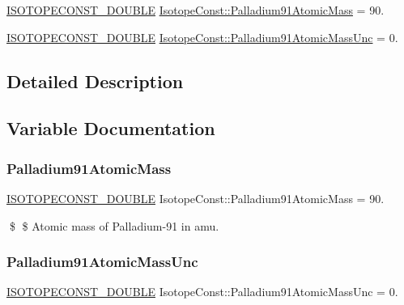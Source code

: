 \begin{DoxyCompactItemize}
\item 
\mbox{\hyperlink{group___isotope_const-_macros_ga8f45a7272ce02c0b4c65c44636ed719a}{I\+S\+O\+T\+O\+P\+E\+C\+O\+N\+S\+T\+\_\+\+D\+O\+U\+B\+LE}} \mbox{\hyperlink{group___isotope_const-_palladium-_pd91_ga8577a1974e32ec66ca52d7e2391aa9aa}{Isotope\+Const\+::\+Palladium91\+Atomic\+Mass}} = 90.
\item 
\mbox{\hyperlink{group___isotope_const-_macros_ga8f45a7272ce02c0b4c65c44636ed719a}{I\+S\+O\+T\+O\+P\+E\+C\+O\+N\+S\+T\+\_\+\+D\+O\+U\+B\+LE}} \mbox{\hyperlink{group___isotope_const-_palladium-_pd91_ga65ca10c35872947e0a65653036e93269}{Isotope\+Const\+::\+Palladium91\+Atomic\+Mass\+Unc}} = 0.
\end{DoxyCompactItemize}


\subsection{Detailed Description}


\subsection{Variable Documentation}
\mbox{\label{group___isotope_const-_palladium-_pd91_ga8577a1974e32ec66ca52d7e2391aa9aa}} 
\subsubsection{\texorpdfstring{Palladium91\+Atomic\+Mass}{Palladium91AtomicMass}}
{\footnotesize\ttfamily \mbox{\hyperlink{group___isotope_const-_macros_ga8f45a7272ce02c0b4c65c44636ed719a}{I\+S\+O\+T\+O\+P\+E\+C\+O\+N\+S\+T\+\_\+\+D\+O\+U\+B\+LE}} Isotope\+Const\+::\+Palladium91\+Atomic\+Mass = 90.}

\$ \$ Atomic mass of Palladium-\/91 in amu. \mbox{\label{group___isotope_const-_palladium-_pd91_ga65ca10c35872947e0a65653036e93269}} 
\subsubsection{\texorpdfstring{Palladium91\+Atomic\+Mass\+Unc}{Palladium91AtomicMassUnc}}
{\footnotesize\ttfamily \mbox{\hyperlink{group___isotope_const-_macros_ga8f45a7272ce02c0b4c65c44636ed719a}{I\+S\+O\+T\+O\+P\+E\+C\+O\+N\+S\+T\+\_\+\+D\+O\+U\+B\+LE}} Isotope\+Const\+::\+Palladium91\+Atomic\+Mass\+Unc = 0.}

